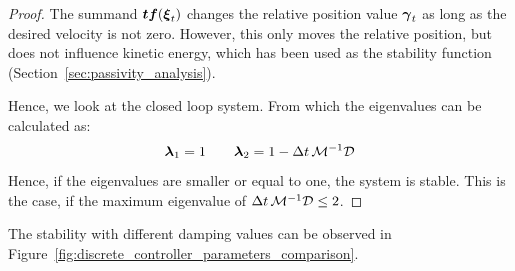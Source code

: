 \begin{proof}
The summand $\boldsymbol{t} \boldsymbol{f}(\boldsymbol{\xi}_t)$ changes the relative position value $\boldsymbol{\gamma}_t$ as long as the desired velocity is not zero. However, this only moves the relative position, but does not influence kinetic energy, which has been used as the stability function (Section~\ref{sec:passivity_analysis}).

Hence, we look at the closed loop system. From which the eigenvalues can be calculated as:
\begin{equation}
	\boldsymbol{\lambda}_1 = 1 \qquad \boldsymbol{\lambda}_2 = 1 - \Delta t \, \mathcal{M}^{-1} \mathcal{D}
\end{equation}
Hence, if the eigenvalues are smaller or equal to one, the system is stable. This is the case, if the maximum eigenvalue of $\Delta t \, \mathcal{M}^{-1} \mathcal{D} \leq 2$.
\end{proof}

The stability with different damping values can be observed in Figure~\ref{fig:discrete_controller_parameters_comparison}.


